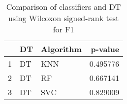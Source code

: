 \begin{table}
\footnotesize
\caption{Comparison of classifiers and DT using Wilcoxon signed-rank test for F1}
\label{tab:DT wilcoxon F1 comparison}
\begin{tabular}{lllr}
\hline
 & DT & Algorithm & p-value \\
\hline
1 & DT & KNN & 0.495776 \\
2 & DT & RF & 0.667141 \\
3 & DT & SVC & 0.829009 \\
\hline
\end{tabular}
\end{table}
